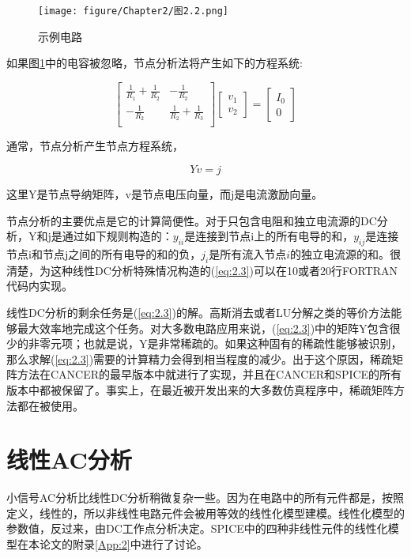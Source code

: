 \begin{figure}[htbp]
\small
    \centering
    \texttt{[image: figure/Chapter2/图2.2.png]}
    \caption{示例电路}
    \label{图2.2}
\end{figure}

如果图\ref{图2.2}中的电容被忽略，节点分析法将产生如下的方程系统:

\begin{equation}
\begin{bmatrix}
\frac{1}{R_1}+\frac{1}{R_2} &-\frac{1}{R_2}  \\
-\frac{1}{R_2} &\frac{1}{R_2}+\frac{1}{R_3}  \\
\end{bmatrix}\begin{bmatrix}
v_1 \\
v_2
\end{bmatrix}=\begin{bmatrix}
I_0 \\
0\end{bmatrix}
\label{eq:2.2}
\end{equation}

通常，节点分析产生节点方程系统，

\begin{equation}
    Yv = j
    \label{eq:2.3}
\end{equation}

这里Y是节点导纳矩阵，v是节点电压向量，而j是电流激励向量。

节点分析的主要优点是它的计算简便性。对于只包含电阻和独立电流源的DC分析，Y和j是通过如下规则构造的：$y_{ii}$是连接到节点i上的所有电导的和，$y_{ij}$是连接节点i和节点j之间的所有电导的和的负，$j_i$是所有流入节点$i$的独立电流源的和。很清楚，为这种线性DC分析特殊情况构造的(\ref{eq:2.3})可以在10或者20行FORTRAN代码内实现。

线性DC分析的剩余任务是(\ref{eq:2.3})的解。高斯消去或者LU分解\cite{ref-35}之类的等价方法能够最大效率地完成这个任务。对大多数电路应用来说，(\ref{eq:2.3})中的矩阵Y包含很少的非零元项；也就是说，Y是非常稀疏的。如果这种固有的稀疏性能够被识别，那么求解(\ref{eq:2.3})需要的计算精力会得到相当程度的减少。出于这个原因，稀疏矩阵方法在CANCER的最早版本中就进行了实现，并且在CANCER和SPICE的所有版本中都被保留了。事实上，在最近被开发出来的大多数仿真程序中，稀疏矩阵方法都在被使用。

\section{线性AC分析}
小信号AC分析比线性DC分析稍微复杂一些。因为在电路中的所有元件都是，按照定义，线性的，所以非线性电路元件会被用等效的线性化模型建模。线性化模型的参数值，反过来，由DC工作点分析决定。SPICE中的四种非线性元件的线性化模型在本论文的附录\ref{App:2}中进行了讨论。

